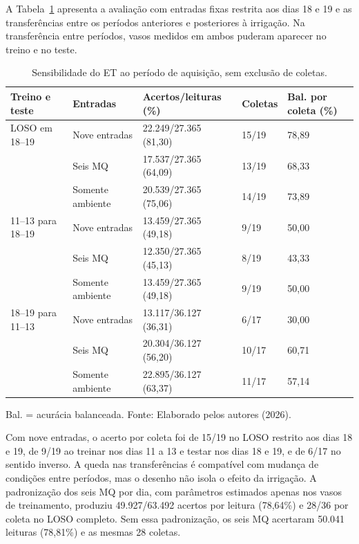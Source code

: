 A Tabela~\ref{tab:sensibilidade_periodos} apresenta a avaliação com
entradas fixas restrita aos dias 18 e 19 e as transferências entre os
períodos anteriores e posteriores à irrigação. Na transferência entre
períodos, vasos medidos em ambos puderam aparecer no treino e no teste.

\begin{table}[H]
    \centering
    \scriptsize
    \caption{Sensibilidade do ET ao período de aquisição, sem exclusão de coletas.}
    \label{tab:sensibilidade_periodos}
    \begin{tabular}{p{}p{}p{}p{}p{}}
        \hline
        Treino e teste & Entradas & Acertos/leituras (\%) & Coletas & Bal. por coleta (\%) \\
        \hline
        LOSO em 18--19 & Nove entradas & 22.249/27.365 (81,30) & 15/19 & 78,89 \\
                         & Seis MQ & 17.537/27.365 (64,09) & 13/19 & 68,33 \\
                         & Somente ambiente & 20.539/27.365 (75,06) & 14/19 & 73,89 \\
        \hline
        11--13 para 18--19 & Nove entradas & 13.459/27.365 (49,18) & 9/19 & 50,00 \\
                            & Seis MQ & 12.350/27.365 (45,13) & 8/19 & 43,33 \\
                            & Somente ambiente & 13.459/27.365 (49,18) & 9/19 & 50,00 \\
        \hline
        18--19 para 11--13 & Nove entradas & 13.117/36.127 (36,31) & 6/17 & 30,00 \\
                            & Seis MQ & 20.304/36.127 (56,20) & 10/17 & 60,71 \\
                            & Somente ambiente & 22.895/36.127 (63,37) & 11/17 & 57,14 \\
        \hline
    \end{tabular}

    \vspace{0.1cm}
    {\footnotesize Bal. = acurácia balanceada. Fonte: Elaborado pelos autores (2026).}
\end{table}

Com nove entradas, o acerto por coleta foi de 15/19 no LOSO restrito
aos dias 18 e 19, de 9/19 ao treinar nos dias 11 a 13 e testar nos dias
18 e 19, e de 6/17 no sentido inverso. A queda nas transferências é
compatível com mudança de condições entre períodos, mas o desenho não
isola o efeito da irrigação. A padronização dos seis MQ por dia, com
parâmetros estimados apenas nos vasos de treinamento, produziu
49.927/63.492 acertos por leitura (78,64\%) e 28/36 por coleta no LOSO
completo. Sem essa padronização, os seis MQ acertaram 50.041 leituras
(78,81\%) e as mesmas 28 coletas.

